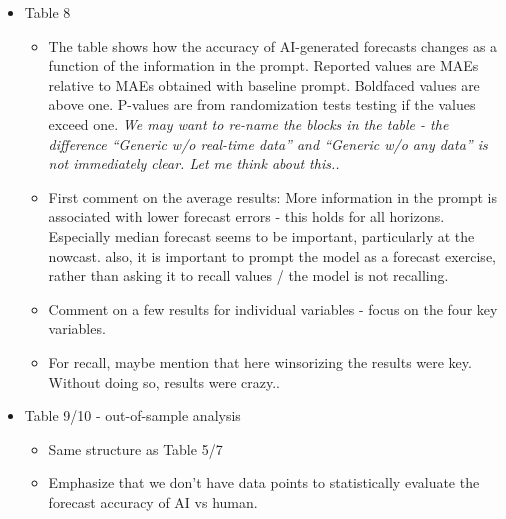 \documentclass{article}
\begin{document}
\begin{itemize}
\begin{itemize}
            \item Mention exceptions: Mainly Non-Farm Payroll and Core CPI.
        \end{itemize}
    \item Table 8
        \begin{itemize}
            \item The table shows how the accuracy of AI-generated forecasts changes as a function of the information in the prompt. Reported values are MAEs relative to MAEs obtained with baseline prompt. Boldfaced values are above one. P-values are from randomization tests testing if the values exceed one. \emph{We may want to re-name the blocks in the table - the difference ``Generic w/o real-time data'' and ``Generic w/o any data'' is not immediately clear. Let me think about this..}
            \item First comment on the average results: More information in the prompt is associated with lower forecast errors - this holds for all horizons. Especially median forecast seems to be important, particularly at the nowcast. also, it is important to prompt the model as a forecast exercise, rather than asking it to recall values / the model is not recalling.
            \item Comment on a few results for individual variables - focus on the four key variables. 
            \item For recall, maybe mention that here winsorizing the results were key. Without doing so, results were crazy..
        \end{itemize}
    \item Table 9/10 - out-of-sample analysis
        \begin{itemize}
            \item Same structure as Table 5/7
            \item Emphasize that we don't have data points to statistically evaluate the forecast accuracy of AI vs human.
        \end{itemize}
\end{itemize}
\end{document}
